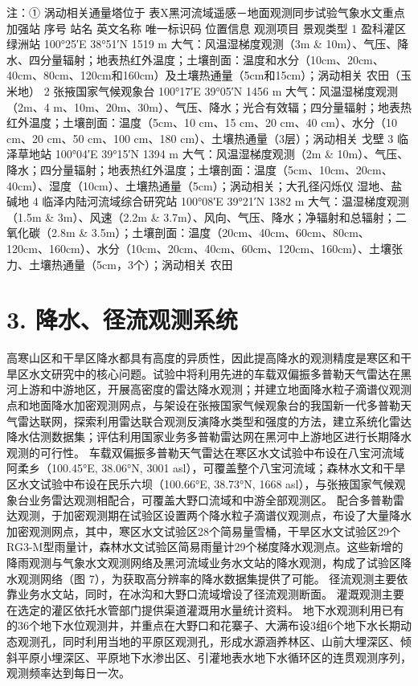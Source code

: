 \documentclass[letterpaper,10pt,english]{sphinxmanual}
\begin{document}
注：① 涡动相关通量塔位于
表X黑河流域遥感－地面观测同步试验气象水文重点加强站
序号      站名      英文名称    唯一标识码   位置信息    观测项目    景观类型
1       盈科灌区绿洲站                 100°25′E
38°51′N
1519 m  大气：风温湿梯度观测（3m \& 10m）、气压、降水、四分量辐射；地表热红外温度；土壤剖面：温度和水分（10cm、20cm、40cm、80cm、120cm和160cm）及土壤热通量（5cm和15cm）；涡动相关       农田（玉米地）
2       张掖国家气候观象台                       100°17′E
39°05′N
1456 m  大气：风温湿梯度观测（2m、4 m、10m、20m、30m）、气压、降水；光合有效辐；四分量辐射；地表热红外温度；土壤剖面：温度（5cm、10 cm、15 cm、20 cm、40 cm）、水分（10 cm、20 cm、50 cm、100 cm、180 cm）、土壤热通量（3层）；涡动相关        戈壁
3       临泽草地站                   100°04′E
39°15′N
1394 m  大气：风温湿梯度观测（2m \& 10m）、气压、降水；四分量辐射；地表热红外温度；土壤剖面：温度（5cm、10cm、20cm、40cm）、湿度（10cm）、土壤热通量（5cm）；涡动相关；大孔径闪烁仪    湿地、盐碱地
4       临泽内陆河流域综合研究站                    100°08′E
39°21′N
1382 m  大气：温湿梯度观测（1.5m \& 3m）、风速（2.2m \& 3.7m）、风向、气压、降水；净辐射和总辐射；二氧化碳（2.8m \& 3.5m）；土壤剖面：温度（20cm、40cm、60cm、80cm、120cm、160cm）、水分（10cm、20cm、40cm、60cm、120cm、160cm）、土壤张力、土壤热通量（5cm，3个）；涡动相关    农田


\section{3. 降水、径流观测系统}
\label{water_observe_system:id4}
高寒山区和干旱区降水都具有高度的异质性，因此提高降水的观测精度是寒区和干旱区水文研究中的核心问题。试验中将利用先进的车载双偏振多普勒天气雷达在黑河上游和中游地区，开展高密度的雷达降水观测；并建立地面降水粒子滴谱仪观测点和地面降水加密观测网点，与架设在张掖国家气候观象台的我国新一代多普勒天气雷达联网，探索利用雷达联合观测反演降水类型和强度的方法，建立系统化雷达降水估测数据集；评估利用国家业务多普勒雷达网在黑河中上游地区进行长期降水观测的可行性。
车载双偏振多普勒天气雷达在寒区水文试验中布设在八宝河流域阿柔乡（100.45°E, 38.06°N, 3001 asl），可覆盖整个八宝河流域；森林水文和干旱区水文试验中布设在民乐六坝（100.66°E, 38.73°N, 1668 asl），与张掖国家气候观象台业务雷达观测相配合，可覆盖大野口流域和中游全部观测区。
配合多普勒雷达观测，于加密观测期在试验区设置两个降水粒子滴谱仪观测点，布设了大量降水加密观测网点，其中，寒区水文试验区28个简易量雪桶，干旱区水文试验区29个RG3-M型雨量计，森林水文试验区简易雨量计29个梯度降水观测点。这些新增的降雨观测与气象水文观测网络及黑河流域业务水文站的降水观测，构成了试验区降水观测网络（图 7），为获取高分辨率的降水数据集提供了可能。
径流观测主要依靠业务水文站，同时，在冰沟和大野口流域增设了径流观测断面。
灌溉观测主要在选定的灌区依托水管部门提供渠道灌溉用水量统计资料。
地下水观测利用已有的36个地下水位观测井，并重点在大野口和花寨子、大满布设3组6个地下水长期动态观测孔，同时利用当地的平原区观测孔，形成水源涵养林区、山前大埋深区、倾斜平原小埋深区、平原地下水渗出区、引灌地表水地下水循环区的连贯观测序列，观测频率达到每日一次。
\end{document}

